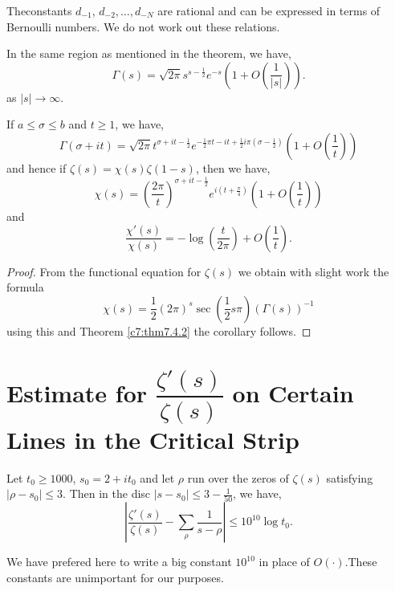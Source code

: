 \begin{remark*}
The\pageoriginale constants $d_{-1}$, $d_{-2},\ldots,d_{-N}$ are
rational and can be expressed in terms of Bernoulli numbers. We do not
work out these relations.
\end{remark*}

\setcounter{corollary}{0}
\begin{corollary}%
In the same region as mentioned in the theorem, we have,
$$
\Gamma(s)=\sqrt{2\pi}s^{s-\frac{1}{2}}e^{-s}\left(1+O\left(\frac{1}{|s|}\right)\right). 
$$
as $|s|\to \infty$.
\end{corollary}

\begin{corollary}%
If $a\leq \sigma\leq b$ and $t\geq 1$, we have,
$$
\Gamma(\sigma+it)=\sqrt{2\pi}t^{\sigma+it-\frac{1}{2}}e^{-\frac{1}{2}\pi
  t-it+\frac{1}{2}i\pi(\sigma-\frac{1}{2})}\left(1+O\left(\frac{1}{t}\right)\right) 
$$
and hence if $\zeta(s)=\chi(s)\zeta(1-s)$, then we have,
$$
\chi(s)=\left(\frac{2\pi}{t}\right)^{\sigma+it-\frac{1}{2}}e^{i(t+\frac{\pi}{4})}\left(1+O\left(\frac{1}{t}\right)\right) 
$$
and
$$
\frac{\chi'(s)}{\chi(s)}=-\log\left(\frac{t}{2\pi}\right)+O\left(\frac{1}{t}\right). 
$$
\end{corollary}

\begin{proof}
From the functional equation for $\zeta(s)$ we obtain with slight work
the formula
$$
\chi(s)=\frac{1}{2}(2\pi)^{s}\sec\left(\frac{1}{2}s\pi\right)(\Gamma(s))^{-1}
$$
using this and Theorem \ref{c7:thm7.4.2} the corollary follows.
\end{proof}

\section{Estimate for $\dfrac{\zeta'(s)}{\zeta(s)}$ on Certain Lines
  in the Critical Strip}\label{c7:sec7.5}

\begin{lem}\label{c7:lem1}
Let $t_{0}\geq 1000$, $s_{0}=2+it_{0}$ and let $\rho$ run over the
zeros of $\zeta(s)$ satisfying $|\rho-s_{0}|\leq 3$. Then in the disc
$|s-s_{0}|\leq 3-\frac{1}{50}$, we have,
$$
|\frac{\zeta'(s)}{\zeta(s)}-\sum_{\rho}\frac{1}{s-\rho}|\leq
10^{10}\log t_{0}.
$$
\end{lem}

\begin{remark*}
We have prefered here to write a big constant $10^{10}$ in place of
$O(\cdot)$.\pageoriginale These constants are unimportant for our
purposes. 
\end{remark*}

